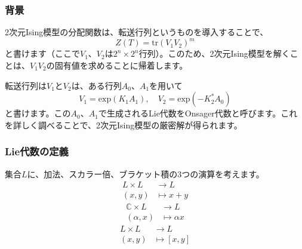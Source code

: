 \documentclass{beamer}
\begin{document}
\begin{frame}
    \frametitle{背景}

    2次元Ising模型の分配関数は、転送行列というものを導入することで、
    \begin{equation}
        Z(T)=\mathrm{tr}(V_1V_2)^m
    \end{equation}
    と書けます（ここで$V_1$、$V_2$は$2^n×2^n$行列）。このため、2次元Ising模型を解くことは、$V_1V_2$の固有値を求めることに帰着します。

    \bigskip

    転送行列は$V_1$と$V_2$は、ある行列$A_0$、$A_1$を用いて
    \begin{equation}
        V_1=\mathrm{exp}(K_1A_1),\quad V_2=\mathrm{exp}(-K_2^*A_0)
    \end{equation}
    と書けます。この$A_0$、$A_1$で生成されるLie代数をOnsager代数と呼びます。これを詳しく調べることで、2次元Ising模型の厳密解が得られます。
\end{frame}

\begin{frame}
    \frametitle{Lie代数の定義}

    集合$L$に、加法、スカラー倍、ブラケット積の3つの演算を考えます。
    \begin{align}
        L\times L & \to L       \\
        (x,y)     & \mapsto x+y
    \end{align}
    \begin{align}
        ℂ\times L & \to L      \\
        (α,x)     & \mapsto αx
    \end{align}
    \begin{align}
        L\times L & \to L        \\
        (x,y)     & \mapsto[x,y]
    \end{align}
\end{frame}
\end{document}
